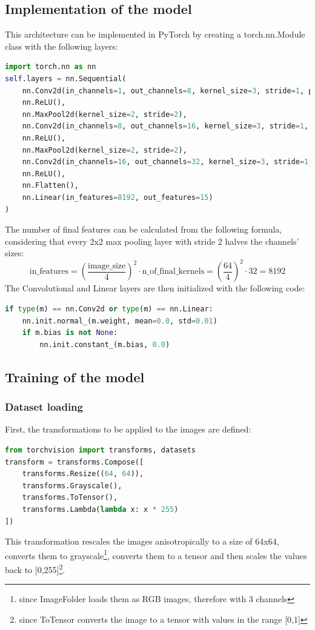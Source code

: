 \documentclass[a4paper, 11pt]{article}
\begin{document}
\subsection{Implementation of the model}
\lstset{style=mystyle}
This architecture can be implemented in PyTorch by creating a torch.nn.Module class with the following layers:
\begin{lstlisting}[language=Python]
import torch.nn as nn
self.layers = nn.Sequential(
    nn.Conv2d(in_channels=1, out_channels=8, kernel_size=3, stride=1, padding=1),
    nn.ReLU(),
    nn.MaxPool2d(kernel_size=2, stride=2),
    nn.Conv2d(in_channels=8, out_channels=16, kernel_size=3, stride=1, padding=1),
    nn.ReLU(),
    nn.MaxPool2d(kernel_size=2, stride=2),
    nn.Conv2d(in_channels=16, out_channels=32, kernel_size=3, stride=1, padding=1),
    nn.ReLU(),
    nn.Flatten(),
    nn.Linear(in_features=8192, out_features=15)
)
\end{lstlisting}
The number of final features can be calculated from the following formula, considering that every 2x2 
max pooling layer with stride 2 halves the channels' sizes:
\begin{equation*}
    \text{in\_features} = \left(\frac{\text{image\_size}}{4}\right)^2 \cdot \text{n\_of\_final\_kernels} = \left(\frac{64}{4}\right)^2 \cdot 32 = 8192
\end{equation*}
The Convolutional and Linear layers are then initialized with the following code:
\begin{lstlisting}[language=Python]
if type(m) == nn.Conv2d or type(m) == nn.Linear:
    nn.init.normal_(m.weight, mean=0.0, std=0.01)
    if m.bias is not None:
        nn.init.constant_(m.bias, 0.0)
\end{lstlisting}

\pagebreak

\subsection{Training of the model}

\subsubsection{Dataset loading}
First, the transformations to be applied to the images are defined:
\begin{lstlisting}[language=Python]
from torchvision import transforms, datasets
transform = transforms.Compose([
    transforms.Resize((64, 64)),
    transforms.Grayscale(),
    transforms.ToTensor(),
    transforms.Lambda(lambda x: x * 255)
])
\end{lstlisting}
This transformation rescales the images anisotropically to a size of 64x64, converts them to 
grayscale\footnote{since ImageFolder loads them as RGB images, therefore with 3 channels}, converts them to a tensor and then
scales the values back to [0,255]\footnote{since ToTensor converts the image to a tensor with values in the range [0,1]}.\\
\end{document}
